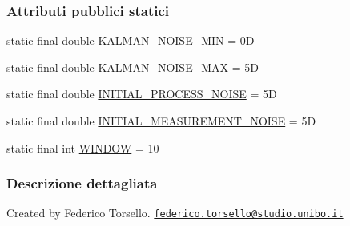 \subsubsection*{Attributi pubblici statici}
\begin{DoxyCompactItemize}
\item 
static final double \hyperlink{classit_1_1unibo_1_1torsello_1_1bluetoothpositioning_1_1constant_1_1KFilterConstants_a8c2adefc8bfb7c419ecfbe3b7ce65112_a8c2adefc8bfb7c419ecfbe3b7ce65112}{K\+A\+L\+M\+A\+N\+\_\+\+N\+O\+I\+S\+E\+\_\+\+M\+IN} = 0D
\item 
static final double \hyperlink{classit_1_1unibo_1_1torsello_1_1bluetoothpositioning_1_1constant_1_1KFilterConstants_aaaf950270c408cc26a79103a56b211cf_aaaf950270c408cc26a79103a56b211cf}{K\+A\+L\+M\+A\+N\+\_\+\+N\+O\+I\+S\+E\+\_\+\+M\+AX} = 5D
\item 
static final double \hyperlink{classit_1_1unibo_1_1torsello_1_1bluetoothpositioning_1_1constant_1_1KFilterConstants_a4604515ac01c25cfabb53248942a00bb_a4604515ac01c25cfabb53248942a00bb}{I\+N\+I\+T\+I\+A\+L\+\_\+\+P\+R\+O\+C\+E\+S\+S\+\_\+\+N\+O\+I\+SE} = 5D
\item 
static final double \hyperlink{classit_1_1unibo_1_1torsello_1_1bluetoothpositioning_1_1constant_1_1KFilterConstants_a5fa646024e9357b089f380b9293f914f_a5fa646024e9357b089f380b9293f914f}{I\+N\+I\+T\+I\+A\+L\+\_\+\+M\+E\+A\+S\+U\+R\+E\+M\+E\+N\+T\+\_\+\+N\+O\+I\+SE} = 5D
\item 
static final int \hyperlink{classit_1_1unibo_1_1torsello_1_1bluetoothpositioning_1_1constant_1_1KFilterConstants_a3c2618e53ad77fcb50785f62868e4c9c_a3c2618e53ad77fcb50785f62868e4c9c}{W\+I\+N\+D\+OW} = 10
\end{DoxyCompactItemize}


\subsubsection{Descrizione dettagliata}
Created by Federico Torsello. \href{mailto:federico.torsello@studio.unibo.it}{\tt federico.\+torsello@studio.\+unibo.\+it} 

